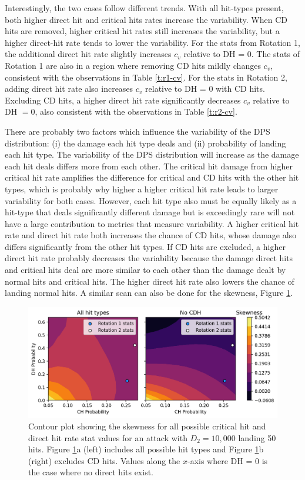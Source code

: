 \documentclass{article}
\begin{document}
        Interestingly, the two cases follow different trends. With all hit-types present, both higher direct hit and critical hits rates increase the variability. When CD hits are removed, higher critical hit rates still increases the variability, but a higher direct-hit rate tends to lower the variability. For the stats from Rotation 1, the additional direct hit rate slightly increases $c_v$ relative to DH = $0$. The stats of Rotation 1 are also in a region where removing CD hits mildly changes $c_v$, consistent with the observations in Table \ref{t:r1-cv}. For the stats in Rotation 2, adding direct hit rate also increases $c_v$ relative to DH = $0$ with CD hits. Excluding CD hits, a higher direct hit rate significantly decreases $c_v$ relative to DH $=0$, also consistent with the observations in Table \ref{t:r2-cv}. 
        
        There are probably two factors which influence the variability of the DPS distribution: (i) the damage each hit type deals and (ii) probability of landing each hit type. The variability of the DPS distribution will increase as the damage each hit deals differs more from each other. The critical hit damage from higher critical hit rate amplifies the difference for critical and CD hits with the other hit types, which is probably why higher a higher critical hit rate leads to larger variability for both cases. However, each hit type also must be equally likely as a hit-type that deals significantly different damage but is exceedingly rare will not have a large contribution to metrics that measure variability. A higher critical hit rate and direct hit rate both increases the chance of CD hits, whose damage also differs significantly from the other hit types. If CD hits are excluded, a higher direct hit rate probably decreases the variability because the damage direct hits and critical hits deal are more similar to each other than the damage dealt by normal hits and critical hits. The higher direct hit rate also lowers the chance of landing normal hits.
        A similar scan can also be done for the skewness, Figure \ref{fig:skew-scan}.
        
        \begin{figure}[H]
            \centering
            \includegraphics[width=0.9\linewidth]{img/skew-skan.png}
            \caption{Contour plot showing the skewness for all possible critical hit and direct hit rate stat values for an attack with $D_2 = 10,000$ landing 50 hits. Figure \ref{fig:skew-scan}a (left) includes all possible hit types and Figure \ref{fig:skew-scan}b (right) excludes CD hits. Values along the $x$-axis where DH = $0$ is the case where no direct hits exist.}\label{fig:skew-scan}
        \end{figure}
\end{document}
